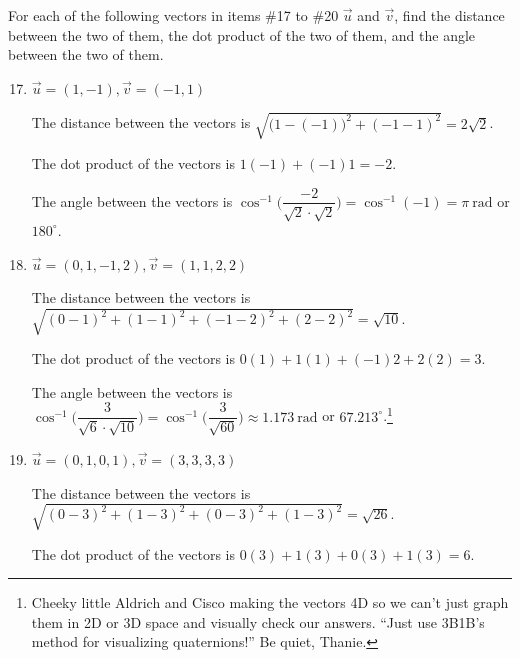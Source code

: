 \documentclass{article}
\begin{document}
\begin{center}
    \colorbox{CornflowerBlue!50}{
    \begin{minipage}[c]{0.9\textwidth}
        \centering
        For each of the following vectors in items \#17 to \#20 \(\overrightarrow{u}\) and \(\overrightarrow{v}\), find the distance between the two of them, the dot product of the two of them, and the angle between the two of them. 
    \end{minipage}
    }
\end{center}
\begin{enumerate}
    \setcounter{enumi}{16}
    \item \(\overrightarrow{u} = (1,-1), \overrightarrow{v} = (-1,1)\)\begin{solution}
        The distance between the vectors is \(\sqrt{{\bigl(1-(-1)\bigr)}^2 + {(-1 -1)}^2} = 2\sqrt{2}\).\par
        The dot product of the vectors is \(1(-1) + (-1)1 = -2\).\par 
        The angle between the vectors is \(\cos^{-1} \biggl(\dfrac{-2}{\sqrt{2}\cdot\sqrt{2}}\biggr) = \cos^{-1} (-1) = \pi~\text{rad}\) or \(180^{\circ}\). 
    \end{solution}
    \item \(\overrightarrow{u} = (0,1,-1,2), \overrightarrow{v} = (1,1,2,2)\)\begin{solution}
        The distance between the vectors is \(\sqrt{{(0-1)}^2 + {(1 -1)}^2 + {(-1 -2)}^2 + {(2 -2)}^2} = \sqrt{10}\).\par
        The dot product of the vectors is \(0(1) + 1(1) + (-1)2 + 2(2) = 3\).\par 
        The angle between the vectors is \(\cos^{-1} \biggl(\dfrac{3}{\sqrt{6}\cdot\sqrt{10}}\biggr) = \cos^{-1} \biggl(\dfrac{3}{\sqrt{60}}\biggr) \approx 1.173~\text{rad}\) or \(67.213^{\circ}\).\footnote{Cheeky little Aldrich and Cisco making the vectors 4D so we can't
        just graph them in 2D or 3D space and visually check our answers. ``Just use 3B1B's method for visualizing quaternions!'' Be quiet, Thanie.} 
    \end{solution}
    \item \(\overrightarrow{u} = (0,1,0,1), \overrightarrow{v} = (3,3,3,3)\)\begin{solution}
        The distance between the vectors is \(\sqrt{{(0-3)}^2 + {(1 -3)}^2 + {(0 -3)}^2 + {(1 -3)}^2} = \sqrt{26}\).\par
        The dot product of the vectors is \(0(3) + 1(3) + 0(3) + 1(3) = 6\).\par 

\end{solution}
\end{enumerate}
\end{document}
